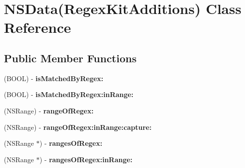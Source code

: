 \hypertarget{interface_n_s_data_07_regex_kit_additions_08}{\section{N\-S\-Data(Regex\-Kit\-Additions) Class Reference}
\label{interface_n_s_data_07_regex_kit_additions_08}
}
\subsection*{Public Member Functions}
\begin{DoxyCompactItemize}
\item 
\hypertarget{interface_n_s_data_07_regex_kit_additions_08_af8d3f7997646aab0cb78a11a06191777}{(B\-O\-O\-L) -\/ {\bfseries is\-Matched\-By\-Regex\-:}}\label{interface_n_s_data_07_regex_kit_additions_08_af8d3f7997646aab0cb78a11a06191777}

\item 
\hypertarget{interface_n_s_data_07_regex_kit_additions_08_a4ad7703b83285ba6e9679d78f98df9c9}{(B\-O\-O\-L) -\/ {\bfseries is\-Matched\-By\-Regex\-:in\-Range\-:}}\label{interface_n_s_data_07_regex_kit_additions_08_a4ad7703b83285ba6e9679d78f98df9c9}

\item 
\hypertarget{interface_n_s_data_07_regex_kit_additions_08_a79d7b1e74ce410450beb79b0e9fe1648}{(N\-S\-Range) -\/ {\bfseries range\-Of\-Regex\-:}}\label{interface_n_s_data_07_regex_kit_additions_08_a79d7b1e74ce410450beb79b0e9fe1648}

\item 
\hypertarget{interface_n_s_data_07_regex_kit_additions_08_a93352fef20624e15c6e0e8d358f8df21}{(N\-S\-Range) -\/ {\bfseries range\-Of\-Regex\-:in\-Range\-:capture\-:}}\label{interface_n_s_data_07_regex_kit_additions_08_a93352fef20624e15c6e0e8d358f8df21}

\item 
\hypertarget{interface_n_s_data_07_regex_kit_additions_08_afb09f7d4d30ad6871e975dbd574afbb2}{(N\-S\-Range $\ast$) -\/ {\bfseries ranges\-Of\-Regex\-:}}\label{interface_n_s_data_07_regex_kit_additions_08_afb09f7d4d30ad6871e975dbd574afbb2}

\item 
\hypertarget{interface_n_s_data_07_regex_kit_additions_08_a0b5438c8c31de2fceb1c32c529983d50}{(N\-S\-Range $\ast$) -\/ {\bfseries ranges\-Of\-Regex\-:in\-Range\-:}}\label{interface_n_s_data_07_regex_kit_additions_08_a0b5438c8c31de2fceb1c32c529983d50}


\end{DoxyCompactItemize}
